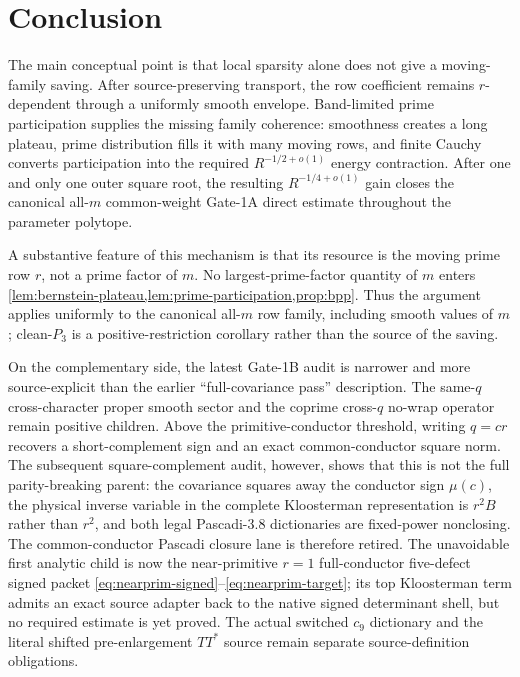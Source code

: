 \documentclass[11pt]{article}
\theoremstyle{definition}
\newcommand{\1}{\mathbf 1}
\begin{document}
\section{Conclusion}
The main conceptual point is that local sparsity alone does not give a
moving-family saving. After source-preserving transport, the row coefficient
remains $r$-dependent through a uniformly smooth envelope. Band-limited prime
participation supplies the missing family coherence: smoothness creates a long
plateau, prime distribution fills it with many moving rows, and finite Cauchy
converts participation into the required $R^{-1/2+o(1)}$ energy contraction.
After one and only one outer square root, the resulting $R^{-1/4+o(1)}$ gain
closes the canonical all-$m$ common-weight Gate-1A direct estimate throughout
the parameter polytope.

A substantive feature of this mechanism is that its resource is the moving
prime row $r$, not a prime factor of $m$.  No largest-prime-factor quantity of
$m$ enters \cref{lem:bernstein-plateau,lem:prime-participation,prop:bpp}.
Thus the argument applies uniformly to the canonical all-$m$ row family,
including smooth values of $m$; clean-$P_3$ is a positive-restriction
corollary rather than the source of the saving.


On the complementary side, the latest Gate-1B audit is narrower and
more source-explicit than the earlier ``full-covariance pass'' description.
The same-$q$ cross-character proper smooth sector and the coprime cross-$q$
no-wrap operator remain positive children.  Above the primitive-conductor
threshold, writing $q=cr$ recovers a short-complement sign and an exact
common-conductor square norm.  The subsequent square-complement audit, however,
shows that this is not the full parity-breaking parent: the covariance squares
away the conductor sign $\mu(c)$, the physical inverse variable in the complete
Kloosterman representation is $r^2B$ rather than $r^2$, and both legal
Pascadi-3.8 dictionaries are fixed-power nonclosing.  The common-conductor
Pascadi closure lane is therefore retired.  The unavoidable first analytic
child is now the near-primitive $r=1$ full-conductor five-defect signed packet
\eqref{eq:nearprim-signed}--\eqref{eq:nearprim-target}; its top Kloosterman
term admits an exact source adapter back to the native signed determinant shell,
but no required estimate is yet proved.  The actual switched $c_9$ dictionary
and the literal shifted pre-enlargement $TT^\ast$ source remain separate
source-definition obligations.
\end{document}
